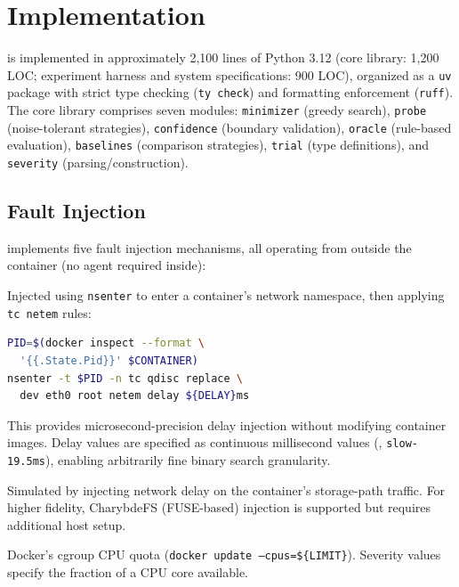 \section{Implementation}
\label{sec:impl}

\system{} is implemented in approximately 2,100 lines of Python 3.12 (core
library: 1,200 LOC; experiment harness and system specifications: 900 LOC),
organized as a \texttt{uv} package with strict type checking (\texttt{ty check})
and formatting enforcement (\texttt{ruff}). The core library comprises seven
modules: \texttt{minimizer} (greedy search), \texttt{probe} (noise-tolerant
strategies), \texttt{confidence} (boundary validation), \texttt{oracle}
(rule-based evaluation), \texttt{baselines} (comparison strategies),
\texttt{trial} (type definitions), and \texttt{severity} (parsing/construction).

\subsection{Fault Injection}
\label{sec:injection}

\system{} implements five fault injection mechanisms, all operating from
outside the container (no agent required inside):

 Injected using \texttt{nsenter} to enter
a container's network namespace, then applying \texttt{tc netem} rules:

\begin{lstlisting}[language=bash,caption={Network fault injection via nsenter.},label={lst:inject-nw}]
PID=$(docker inspect --format \
  '{{.State.Pid}}' $CONTAINER)
nsenter -t $PID -n tc qdisc replace \
  dev eth0 root netem delay ${DELAY}ms
\end{lstlisting}

This provides microsecond-precision delay injection without modifying container
images. Delay values are specified as continuous millisecond values (\eg{},
\texttt{slow-19.5ms}), enabling arbitrarily fine binary search granularity.

\para{Filesystem faults (\texttt{fs})} Simulated by injecting network delay on
the container's storage-path traffic. For higher fidelity, CharybdeFS
(FUSE-based) injection is supported but requires additional host setup.

\para{CPU faults (\texttt{cpu})} Docker's cgroup CPU quota
(\texttt{docker update --cpus=\$\{LIMIT\}}).
Severity values specify the fraction of a CPU core available.

